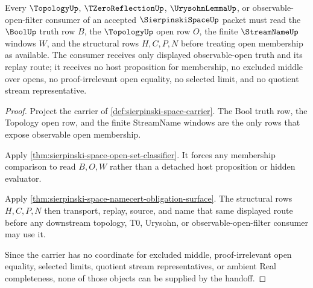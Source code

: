 \begin{theorem}
\label{thm:sierpinski-space-consumer-handoff}
Every $\TopologyUp$, $\TZeroReflectionUp$, $\UrysohnLemmaUp$, or observable-open-filter consumer of an accepted $\SierpinskiSpaceUp$ packet must read the $\BoolUp$ truth row $B$, the $\TopologyUp$ open row $O$, the finite $\StreamNameUp$ windows $W$, and the structural rows $H,C,P,N$ before treating open membership as available. The consumer receives only displayed observable-open truth and its replay route; it receives no host proposition for membership, no excluded middle over opens, no proof-irrelevant open equality, no selected limit, and no quotient stream representative.
\end{theorem}
\begin{proof}
Project the carrier of \autoref{def:sierpinski-space-carrier}. The Bool truth row, the Topology open row, and the finite StreamName windows are the only rows that expose observable open membership.

Apply \autoref{thm:sierpinski-space-open-set-classifier}. It forces any membership comparison to read $B,O,W$ rather than a detached host proposition or hidden evaluator.

Apply \autoref{thm:sierpinski-space-namecert-obligation-surface}. The structural rows $H,C,P,N$ then transport, replay, source, and name that same displayed route before any downstream topology, T0, Urysohn, or observable-open-filter consumer may use it.

Since the carrier has no coordinate for excluded middle, proof-irrelevant open equality, selected limits, quotient stream representatives, or ambient Real completeness, none of those objects can be supplied by the handoff.
\end{proof}

